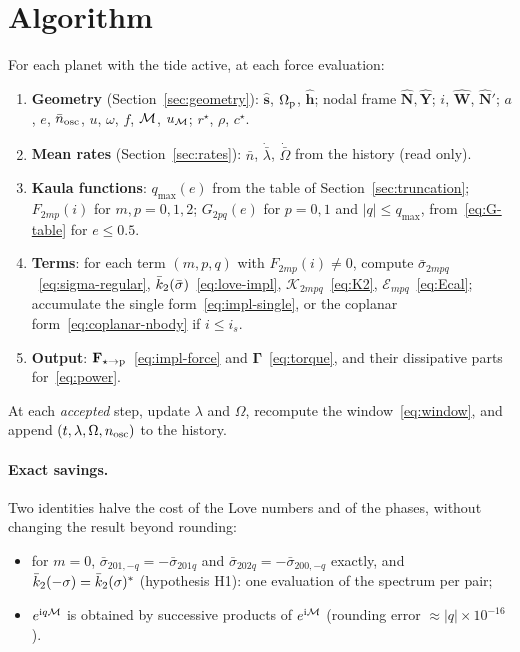 \section{Algorithm}\label{sec:algorithm}
For each planet with the tide active, at each force evaluation:
\begin{enumerate}
  \item \textbf{Geometry} (Section~\ref{sec:geometry}): $\hat{\mathbf s}$, $\Omega_{\mathrm p}$, $\hat{\mathbf h}$; nodal frame $\hat{\mathbf N},\hat{\mathbf Y}$; $i$, $\hat{\mathbf W}$, $\hat{\mathbf N}'$; $a$, $e$, $\bar n_{\rm osc}$, $u$, $\omega$, $f$, $\mathcal{M}$, $u_{\mathcal{M}}$; $r^\star$, $\rho$, $c^\star$.
  \item \textbf{Mean rates} (Section~\ref{sec:rates}): $\bar n$, $\dot{\bar\lambda}$, $\dot{\bar\Omega}$ from the history (read only).
  \item \textbf{Kaula functions}: $q_{\max}(e)$ from the table of Section~\ref{sec:truncation}; $F_{2mp}(i)$ for $m,p=0,1,2$; $G_{2pq}(e)$ for $p=0,1$ and $|q|\le q_{\max}$, from~\eqref{eq:G-table} for $e\le0.5$.
  \item \textbf{Terms}: for each term $(m,p,q)$ with $F_{2mp}(i)\neq0$, compute $\bar\sigma_{2mpq}$~\eqref{eq:sigma-regular}, $\bar k_2(\bar\sigma)$~\eqref{eq:love-impl}, $\mathcal K_{2mpq}$~\eqref{eq:K2}, $\mathcal E_{mpq}$~\eqref{eq:Ecal}; accumulate the single form~\eqref{eq:impl-single}, or the coplanar form~\eqref{eq:coplanar-nbody} if $i\le i_s$.
  \item \textbf{Output}: $\mathbf F_{\star\to\mathrm p}$~\eqref{eq:impl-force} and $\boldsymbol\Gamma$~\eqref{eq:torque}, and their dissipative parts for~\eqref{eq:power}.
\end{enumerate}
At each \emph{accepted} step, update $\lambda$ and $\Omega$, recompute the window~\eqref{eq:window}, and append $(t,\lambda,\Omega,n_{\rm osc})$ to the history.

\paragraph{Exact savings.} Two identities halve the cost of the Love numbers and of the phases, without changing the result beyond rounding:
\begin{itemize}
  \item for $m=0$, $\bar\sigma_{201,-q}=-\bar\sigma_{201q}$ and $\bar\sigma_{202q}=-\bar\sigma_{200,-q}$ exactly, and $\bar k_2(-\sigma)=\bar k_2(\sigma)^*$ (hypothesis H1): one evaluation of the spectrum per pair;
  \item $e^{\mathrm{i} q\mathcal{M}}$ is obtained by successive products of $e^{\mathrm{i}\mathcal{M}}$ (rounding error $\approx|q|\times10^{-16}$).
\end{itemize}


